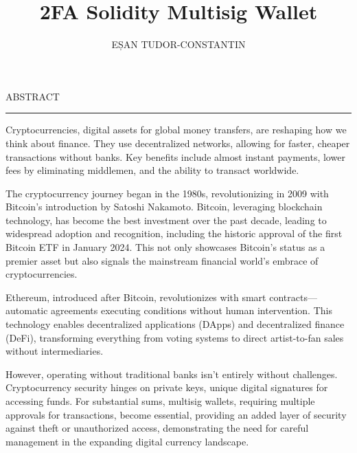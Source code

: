 \documentclass[12pt]{report}
\begin{document}
\title{2FA Solidity Multisig Wallet}					   
\author{EȘAN TUDOR-CONSTANTIN}											
				
\maketitle


\newpage
\thispagestyle{empty}
\mbox{}
\newpage
{} 

\cleardoublepage
ABSTRACT
\vspace{0.5cm}	
\hrule
\vspace{0.5cm}	

\par Cryptocurrencies, digital assets for global money transfers, are reshaping how we think about finance. They use decentralized networks, allowing for faster, cheaper transactions without banks. Key benefits include almost instant payments, lower fees by eliminating middlemen, and the ability to transact worldwide.

\par The cryptocurrency journey began in the 1980s, revolutionizing in 2009 with Bitcoin's introduction by Satoshi Nakamoto. Bitcoin, leveraging blockchain technology, has become the best investment over the past decade, leading to widespread adoption and recognition, including the historic approval of the first Bitcoin ETF in January 2024. This not only showcases Bitcoin's status as a premier asset but also signals the mainstream financial world's embrace of cryptocurrencies.

\par Ethereum, introduced after Bitcoin, revolutionizes with smart contracts—automatic agreements executing conditions without human intervention. This technology enables decentralized applications (DApps) and decentralized finance (DeFi), transforming everything from voting systems to direct artist-to-fan sales without intermediaries.

\par However, operating without traditional banks isn't entirely without challenges. Cryptocurrency security hinges on private keys, unique digital signatures for accessing funds. For substantial sums, multisig wallets, requiring multiple approvals for transactions, become essential, providing an added layer of security against theft or unauthorized access, demonstrating the need for careful management in the expanding digital currency landscape.
\end{document}
